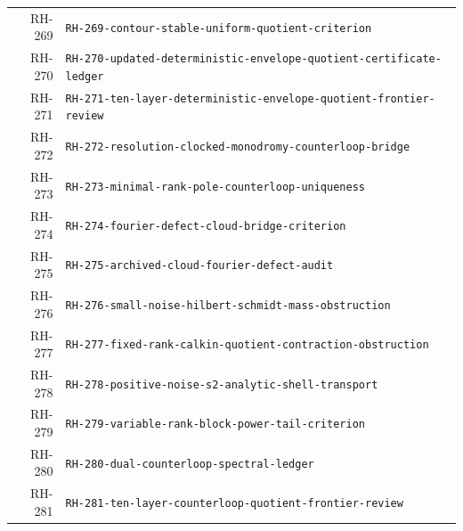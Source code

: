 \begin{longtable}{r >{\raggedright\arraybackslash}p{}}
RH-269 & \texttt{RH-\allowbreak{}269-\allowbreak{}contour-\allowbreak{}stable-\allowbreak{}uniform-\allowbreak{}quotient-\allowbreak{}criterion}\\
RH-270 & \texttt{RH-\allowbreak{}270-\allowbreak{}updated-\allowbreak{}deterministic-\allowbreak{}envelope-\allowbreak{}quotient-\allowbreak{}certificate-\allowbreak{}ledger}\\
RH-271 & \texttt{RH-\allowbreak{}271-\allowbreak{}ten-\allowbreak{}layer-\allowbreak{}deterministic-\allowbreak{}envelope-\allowbreak{}quotient-\allowbreak{}frontier-\allowbreak{}review}\\
RH-272 & \texttt{RH-\allowbreak{}272-\allowbreak{}resolution-\allowbreak{}clocked-\allowbreak{}monodromy-\allowbreak{}counterloop-\allowbreak{}bridge}\\
RH-273 & \texttt{RH-\allowbreak{}273-\allowbreak{}minimal-\allowbreak{}rank-\allowbreak{}pole-\allowbreak{}counterloop-\allowbreak{}uniqueness}\\
RH-274 & \texttt{RH-\allowbreak{}274-\allowbreak{}fourier-\allowbreak{}defect-\allowbreak{}cloud-\allowbreak{}bridge-\allowbreak{}criterion}\\
RH-275 & \texttt{RH-\allowbreak{}275-\allowbreak{}archived-\allowbreak{}cloud-\allowbreak{}fourier-\allowbreak{}defect-\allowbreak{}audit}\\
RH-276 & \texttt{RH-\allowbreak{}276-\allowbreak{}small-\allowbreak{}noise-\allowbreak{}hilbert-\allowbreak{}schmidt-\allowbreak{}mass-\allowbreak{}obstruction}\\
RH-277 & \texttt{RH-\allowbreak{}277-\allowbreak{}fixed-\allowbreak{}rank-\allowbreak{}calkin-\allowbreak{}quotient-\allowbreak{}contraction-\allowbreak{}obstruction}\\
RH-278 & \texttt{RH-\allowbreak{}278-\allowbreak{}positive-\allowbreak{}noise-\allowbreak{}s2-\allowbreak{}analytic-\allowbreak{}shell-\allowbreak{}transport}\\
RH-279 & \texttt{RH-\allowbreak{}279-\allowbreak{}variable-\allowbreak{}rank-\allowbreak{}block-\allowbreak{}power-\allowbreak{}tail-\allowbreak{}criterion}\\
RH-280 & \texttt{RH-\allowbreak{}280-\allowbreak{}dual-\allowbreak{}counterloop-\allowbreak{}spectral-\allowbreak{}ledger}\\
RH-281 & \texttt{RH-\allowbreak{}281-\allowbreak{}ten-\allowbreak{}layer-\allowbreak{}counterloop-\allowbreak{}quotient-\allowbreak{}frontier-\allowbreak{}review}\\
\bottomrule
\end{longtable}
